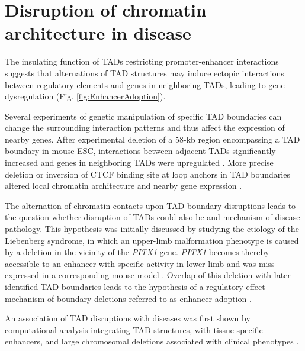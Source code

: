 \documentclass[a4paper,twoside=true,openright,parskip=full,chapterprefix=true,11pt,headings=normal,bibliography=totoc,listof=totoc,titlepage=on,captions=tableabove,draft=false]{scrreprt}
\theoremstyle{definition}
\theoremstyle{definition}
\theoremstyle{definition}
\theoremstyle{remark}
\begin{document}
\hypertarget{disruption-of-chromatin-architecture-in-disease}{%
\section{Disruption of chromatin architecture in
disease}\label{disruption-of-chromatin-architecture-in-disease}}

The insulating function of TADs restricting promoter-enhancer
interactions \citep{Symmons2014} suggests that alternations of TAD
structures may induce ectopic interactions between regulatory elements
and genes in neighboring TADs, leading to gene dysregulation (Fig.
\ref{fig:EnhancerAdoption}).

Several experiments of genetic manipulation of specific TAD boundaries
can change the surrounding interaction patterns and thus affect the
expression of nearby genes. After experimental deletion of a 58-kb
region encompassing a TAD boundary in mouse ESC, interactions between
adjacent TADs significantly increased and genes in neighboring TADs were
upregulated \citep{Nora2012}. More precise deletion or inversion of CTCF
binding site at loop anchors in TAD boundaries altered local chromatin
architecture and nearby gene expression
\citep{Dowen2014, Guo2015, Narendra2015}.

The alternation of chromatin contacts upon TAD boundary disruptions
leads to the question whether disruption of TADs could also be and
mechanism of disease pathology. This hypothesis was initially discussed
by studying the etiology of the Liebenberg syndrome, in which an
upper-limb malformation phenotype is caused by a deletion in the
vicinity of the \emph{PITX1} gene. \emph{PITX1} becomes thereby
accessible to an enhancer with specific activity in lower-limb and was
miss-expressed in a corresponding mouse model \citep{Spielmann2012}.
Overlap of this deletion with later identified TAD boundaries leads to
the hypothesis of a regulatory effect mechanism of boundary deletions
referred to as enhancer adoption \citep{Spielmann2013a}.

An association of TAD disruptions with diseases was first shown by
computational analysis integrating TAD structures, with tissue-specific
enhancers, and large chromosomal deletions associated with clinical
phenotypes \citep{Ibn-Salem2014}.
\end{document}
